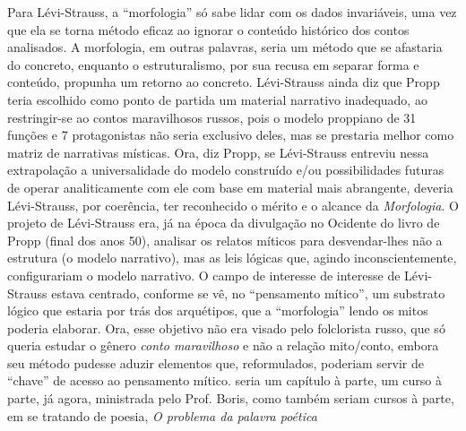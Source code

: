 {  Para Lévi-Strauss, a ``morfologia'' só sabe lidar com os dados
  invariáveis, uma vez que ela se torna método eficaz ao ignorar o
  conteúdo histórico dos contos analisados. A morfologia, em outras
  palavras, seria um método que se afastaria do concreto, enquanto o
  estruturalismo, por sua recusa em separar forma e conteúdo, propunha
  um retorno ao concreto. Lévi-Strauss ainda diz que Propp teria
  escolhido como ponto de partida um material narrativo inadequado, ao
  restringir-se ao contos maravilhosos russos, pois o modelo proppiano
  de 31 funções e 7 protagonistas não seria exclusivo deles, mas se
  prestaria melhor como matriz de narrativas místicas. Ora, diz Propp,
  se Lévi-Strauss entreviu nessa extrapolação a universalidade do modelo
  construído e/ou possibilidades futuras de operar analiticamente com
  ele com base em material mais abrangente, deveria Lévi-Strauss, por
  coerência, ter reconhecido o mérito e o alcance da \emph{Morfologia}.
  O projeto de Lévi-Strauss era, já na época da divulgação no Ocidente
  do livro de Propp (final dos anos 50), analisar os relatos míticos
  para desvendar-lhes não a estrutura (o modelo narrativo), mas as leis
  lógicas que, agindo inconscientemente, configurariam o modelo
  narrativo. O campo de interesse de interesse de Lévi-Strauss estava
  centrado, conforme se vê, no ``pensamento mítico'', um substrato
  lógico que estaria por trás dos arquétipos, que a ``morfologia'' lendo
  os mitos poderia elaborar. Ora, esse objetivo não era visado pelo
  folclorista russo, que só queria estudar o gênero \emph{conto
  maravilhoso} e não a relação mito/conto, embora seu método pudesse
  aduzir elementos que, reformulados, poderiam servir de ``chave'' de
  acesso ao pensamento mítico.} seria um capítulo à parte, um curso à
parte, já agora, ministrada pelo Prof. Boris, como também seriam cursos
à parte, em se tratando de poesia, \emph{O problema da palavra poética}
